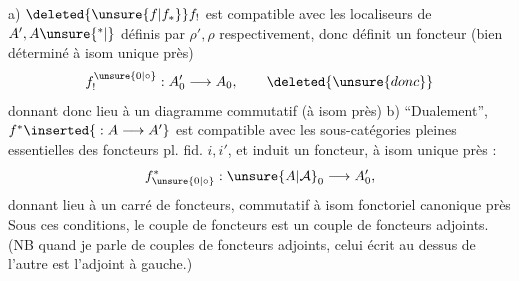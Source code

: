a) $\deleted{\unsure{f|f_*}} f_!$ est compatible avec les localiseurs de $A',A\unsure{{}^{*}|{}}$ définis par $\rho',\rho$ respectivement, donc définit un foncteur (bien déterminé à isom unique près)
\[
 f_!^{\unsure{0|\circ}}:A'_0\longrightarrow A_0,\qquad\deleted{\unsure{donc}}
\]
 donnant donc lieu à un diagramme commutatif (à isom  près)
b) ``Dualement'', $f^*\inserted{{}:A\longrightarrow A'}$ est compatible avec les sous-catégories pleines   essentielles des foncteurs pl. fid. $i,i'$, et induit
  un foncteur,  à isom unique près :
\[
 f_{\unsure{0|\circ}}^*:\unsure{A|\mathcal{A}}_0\longrightarrow A'_0,
\]
donnant lieu à un carré de foncteurs, commutatif à isom fonctoriel canonique près
Sous ces conditions, le couple de foncteurs
est un couple de foncteurs adjoints. (NB quand je parle de couples de foncteurs adjoints, celui écrit au dessus de l'autre est l'adjoint à gauche.)

